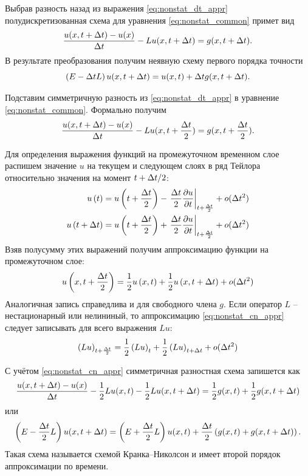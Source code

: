 
Выбрав разность назад из выражения \eqref{eq:nonstat_dt_appr}
полудискретизованная схема для уравнения \eqref{eq:nonstat_common} примет вид
\begin{equation*}
    \frac{u(x, t+\Delta t) - u(x)}{\Delta t} - L u(x, t+\Delta t) = g(x, t+\Delta t).
\end{equation*}
В результате преобразования получим неявную схему первого порядка точности
\begin{equation}
    \label{eq:nonstat_implicit}
    \left(E-\Delta t L\right) u(x, t+\Delta t) = u(x, t) + \Delta t g(x, t + \Delta t).
\end{equation}


Подставим симметричную разность из \eqref{eq:nonstat_dt_appr}
в уравнение \eqref{eq:nonstat_common}. Формально получим
\begin{equation*}
    \frac{u(x, t+\Delta t) - u(x)}{\Delta t} - L u(x, t+\frac{\Delta t}{2}) = g(x, t+\frac{\Delta t}{2}).
\end{equation*}

Для определения выражения функций на промежуточном временном слое
распишем значение $u$ на текущем и следующем слоях в ряд Тейлора
относительно значения на момент $t+\Delta t/2$:
\begin{align*}
    u\left(t\right)      &= u\left(t+\frac{\Delta t}{2}\right) - \left.\frac{\Delta t}{2}\frac{\partial u}{\partial t}\right|_{t+\frac{\Delta t}{2}} + o(\Delta t^2)\\
    u\left(t+\Delta t\right) &= u\left(t+\frac{\Delta t}{2}\right) + \left.\frac{\Delta t}{2}\frac{\partial u}{\partial t}\right|_{t+\frac{\Delta t}{2}} + o(\Delta t^2)
\end{align*}
Взяв полусумму этих выражений получим аппроксимацию функции на промежуточном слое:
\begin{equation}
    \label{eq:nonstat_cn_appr}
    u\left(x, t + \frac{\Delta t}{2}\right) = \frac12u\left(x, t\right) + \frac12u\left(x, t+\Delta t\right) + o(\Delta t^2)
\end{equation}
Аналогичная запись справедлива и для свободного члена $g$.
Если оператор $L$ -- нестационарный или нелининый, то аппроксимацию \eqref{eq:nonstat_cn_appr}
следует записывать для всего выражения $Lu$:
\begin{equation*}
    \left(Lu\right)_{t+\frac{\Delta t}{2}} = \frac12\left(Lu\right)_{t} + \frac12\left(Lu\right)_{t+\Delta t} + o(\Delta t^2)
\end{equation*}


С учётом \eqref{eq:nonstat_cn_appr} симметричная разностная схема
запишется как
\begin{equation*}
    \frac{u(x, t+\Delta t) - u(x)}{\Delta t} - \frac12L u(x, t) - \frac12 L u(x, t + \Delta t) = \frac12 g(x, t) + \frac12 g(x, t+\Delta t)
\end{equation*}
или
\begin{equation}
    \label{eq:nonstat_cn}
    \left(E-\frac{\Delta t}{2} L\right) u(x, t+\Delta t) = \left(E + \frac{\Delta t}{2} L\right) u(x, t) + \frac{\Delta t}{2} \left(g(x, t) + g(x, t + \Delta t)\right).
\end{equation}
Такая схема называется схемой Кранка--Николсон и имеет второй порядок аппроксимации по времени.

